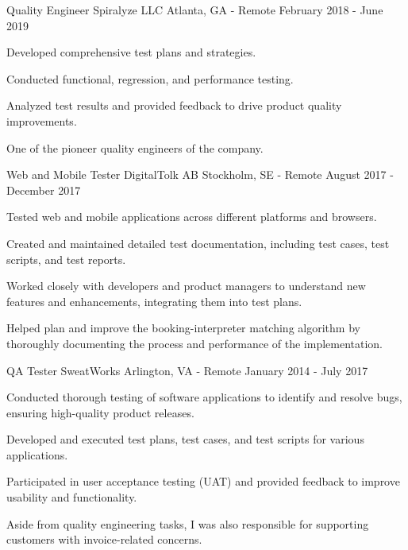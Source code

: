 \begin{cventries}
  \cventry
    {Quality Engineer} %
    {Spiralyze LLC} %
    {Atlanta, GA - Remote} %
    {February 2018 - June 2019} %
    {
      \begin{cvitems} %
        \item {Developed comprehensive test plans and strategies.}
        \item {Conducted functional, regression, and performance testing.}
        \item {Analyzed test results and provided feedback to drive product quality improvements.}
        \item {One of the pioneer quality engineers of the company.}
      \end{cvitems}
    }

  \cventry
  {Web and Mobile Tester} %
  {DigitalTolk AB} %
  {Stockholm, SE - Remote} %
  {August 2017 - December 2017} %
  {
    \begin{cvitems} %
      \item {Tested web and mobile applications across different platforms and browsers.}
      \item {Created and maintained detailed test documentation, including test cases, test scripts, and test reports.}
      \item {Worked closely with developers and product managers to understand new features and enhancements, integrating them into test plans.}
      \item {Helped plan and improve the booking-interpreter matching algorithm by thoroughly documenting the process and performance of the implementation.}
    \end{cvitems}
  }

  \cventry
    {QA Tester} %
    {SweatWorks} %
    {Arlington, VA - Remote} %
    {January 2014 - July 2017} %
    {
      \begin{cvitems} %
        \item {Conducted thorough testing of software applications to identify and resolve bugs, ensuring high-quality product releases.}
        \item {Developed and executed test plans, test cases, and test scripts for various applications.}
        \item {Participated in user acceptance testing (UAT) and provided feedback to improve usability and functionality.}
        \item {Aside from quality engineering tasks, I was also responsible for supporting customers with invoice-related concerns.}
      \end{cvitems}
    }

\end{cventries}
